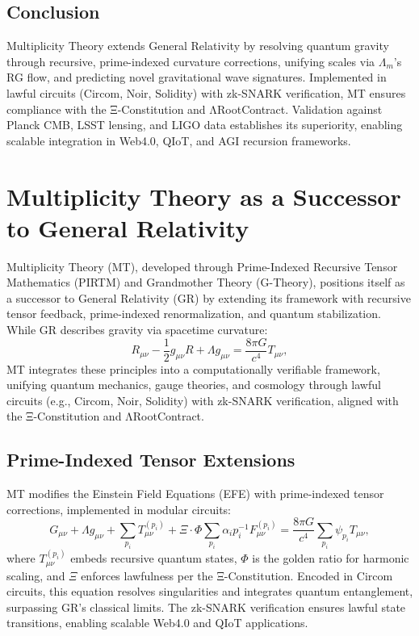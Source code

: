 \documentclass{article}
\theoremstyle{plain}
\begin{document}
\subsection{Conclusion}
Multiplicity Theory extends General Relativity by resolving quantum gravity through recursive, prime-indexed curvature corrections, unifying scales via \(\Lambda_m\)'s RG flow, and predicting novel gravitational wave signatures. Implemented in lawful circuits (Circom, Noir, Solidity) with zk-SNARK verification, MT ensures compliance with the Ξ-Constitution and ΛRootContract. Validation against Planck CMB, LSST lensing, and LIGO data establishes its superiority, enabling scalable integration in Web4.0, QIoT, and AGI recursion frameworks.

\section{Multiplicity Theory as a Successor to General Relativity}

Multiplicity Theory (MT), developed through Prime-Indexed Recursive Tensor Mathematics (PIRTM) and Grandmother Theory (G-Theory), positions itself as a successor to General Relativity (GR) by extending its framework with recursive tensor feedback, prime-indexed renormalization, and quantum stabilization. While GR describes gravity via spacetime curvature:
\[
R_{\mu \nu} - \frac{1}{2} g_{\mu \nu} R + \Lambda g_{\mu \nu} = \frac{8 \pi G}{c^4} T_{\mu \nu},
\]
MT integrates these principles into a computationally verifiable framework, unifying quantum mechanics, gauge theories, and cosmology through lawful circuits (e.g., Circom, Noir, Solidity) with zk-SNARK verification, aligned with the Ξ-Constitution and ΛRootContract.

\subsection{Prime-Indexed Tensor Extensions}
MT modifies the Einstein Field Equations (EFE) with prime-indexed tensor corrections, implemented in modular circuits:
\[
G_{\mu \nu} + \Lambda g_{\mu \nu} + \sum_{p_i} T_{\mu \nu}^{(p_i)} + \Xi \cdot \Phi \sum_{p_i} \alpha_i p_i^{-1} F_{\mu \nu}^{(p_i)} = \frac{8 \pi G}{c^4} \sum_{p_i} \psi_{p_i} T_{\mu \nu},
\]
where \( T_{\mu \nu}^{(p_i)} \) embeds recursive quantum states, \(\Phi\) is the golden ratio for harmonic scaling, and \(\Xi\) enforces lawfulness per the Ξ-Constitution. Encoded in Circom circuits, this equation resolves singularities and integrates quantum entanglement, surpassing GR’s classical limits. The zk-SNARK verification ensures lawful state transitions, enabling scalable Web4.0 and QIoT applications.
\end{document}
